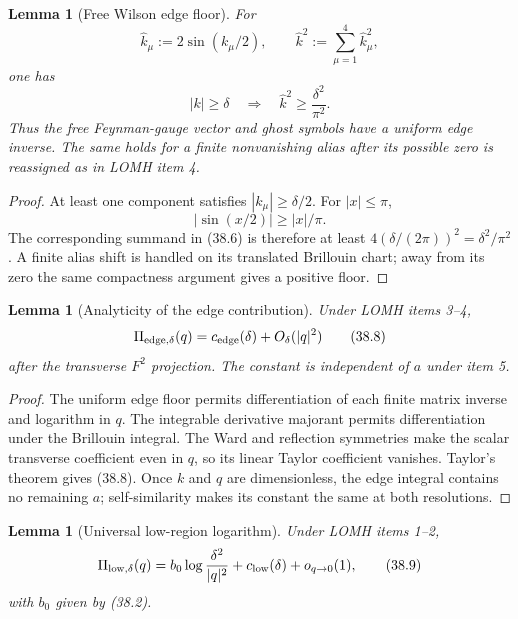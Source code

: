 \documentclass[11pt,oneside]{book}
\newtheorem{lemma}[theorem]{Lemma}
\theoremstyle{definition}
\theoremstyle{remark}
\begin{document}
\begin{lemma}[Free Wilson edge floor]
\label{lem:e8v38-Wilson-floor}
For
\[
 \widehat k_\mu:=2\sin(k_\mu/2),\qquad
 \widehat k^2:=\sum_{\mu=1}^4\widehat k_\mu^2,                   \tag{38.6}
\]
one has
\[
 |k|\geq\delta
 \quad\Longrightarrow\quad
 \widehat k^2\geq\frac{\delta^2}{\pi^2}.                         \tag{38.7}
\]
Thus the free Feynman-gauge vector and ghost symbols have a uniform
edge inverse.  The same holds for a finite nonvanishing alias after
its possible zero is reassigned as in LOMH item 4.
\end{lemma}

\begin{proof}
At least one component satisfies \(|k_\mu|\geq\delta/2\).
For \(|x|\leq\pi\),
\[
                         |\sin(x/2)|\geq |x|/\pi.
\]
The corresponding summand in (38.6) is therefore at least
\(4(\delta/(2\pi))^2=\delta^2/\pi^2\).  A finite alias shift is
handled on its translated Brillouin chart; away from its zero the
same compactness argument gives a positive floor.
\end{proof}

\begin{lemma}[Analyticity of the edge contribution]
\label{lem:e8v38-edge-analytic}
Under LOMH items 3--4,
\[
 \Pi_{\rm edge,\delta}(q)
 =
 c_{\rm edge}(\delta)
 +O_\delta(|q|^2)                                                \tag{38.8}
\]
after the transverse \(F^2\) projection.  The constant is independent
of \(a\) under item 5.
\end{lemma}

\begin{proof}
The uniform edge floor permits differentiation of each finite
matrix inverse and logarithm in \(q\).  The integrable derivative
majorant permits differentiation under the Brillouin integral.
The Ward and reflection symmetries make the scalar transverse
coefficient even in \(q\), so its linear Taylor coefficient vanishes.
Taylor's theorem gives (38.8).  Once \(k\) and \(q\) are dimensionless,
the edge integral contains no remaining \(a\); self-similarity makes
its constant the same at both resolutions.
\end{proof}

\begin{lemma}[Universal low-region logarithm]
\label{lem:e8v38-low-log}
Under LOMH items 1--2,
\[
 \Pi_{\rm low,\delta}(q)
 =
 b_0\log\frac{\delta^2}{|q|^2}
 +c_{\rm low}(\delta)+o_{q\to0}(1),                              \tag{38.9}
\]
with \(b_0\) given by (38.2).
\end{lemma}
\end{document}
